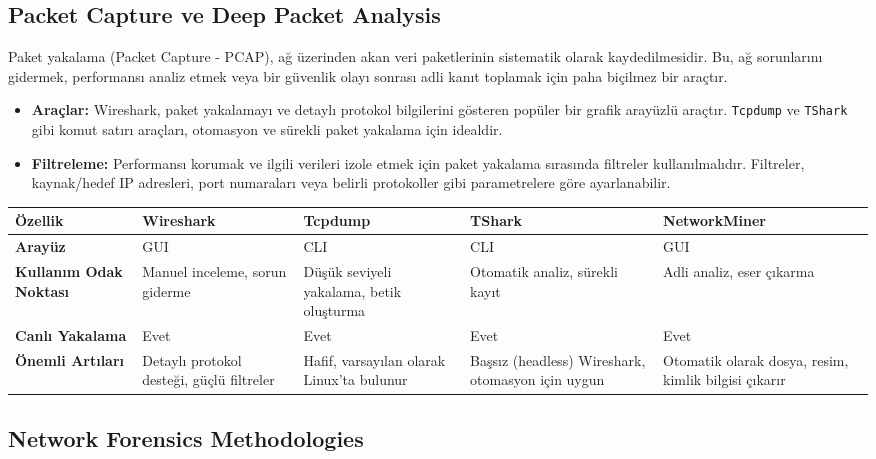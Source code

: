 \subsection{Packet Capture ve Deep Packet Analysis}

Paket yakalama (Packet Capture - PCAP), ağ üzerinden akan veri paketlerinin sistematik olarak kaydedilmesidir. Bu, ağ sorunlarını gidermek, performansı analiz etmek veya bir güvenlik olayı sonrası adli kanıt toplamak için paha biçilmez bir araçtır.

\begin{itemize}
\item \textbf{Araçlar:} Wireshark, paket yakalamayı ve detaylı protokol bilgilerini gösteren popüler bir grafik arayüzlü araçtır. \texttt{Tcpdump} ve \texttt{TShark} gibi komut satırı araçları, otomasyon ve sürekli paket yakalama için idealdir.
\item \textbf{Filtreleme:} Performansı korumak ve ilgili verileri izole etmek için paket yakalama sırasında filtreler kullanılmalıdır. Filtreler, kaynak/hedef IP adresleri, port numaraları veya belirli protokoller gibi parametrelere göre ayarlanabilir.
\end{itemize}


\begin{adjustbox}{max width=\textwidth}
\begin{tabularx}{\textwidth}{|l|X|X|X|X|}
\hline
\textbf{Özellik} & \textbf{Wireshark} & \textbf{Tcpdump} & \textbf{TShark} & \textbf{NetworkMiner} \\
\hline
\textbf{Arayüz} & GUI & CLI & CLI & GUI \\
\hline
\textbf{Kullanım Odak Noktası} & Manuel inceleme, sorun giderme & Düşük seviyeli yakalama, betik oluşturma & Otomatik analiz, sürekli kayıt & Adli analiz, eser çıkarma \\
\hline
\textbf{Canlı Yakalama} & Evet & Evet & Evet & Evet \\
\hline
\textbf{Önemli Artıları} & Detaylı protokol desteği, güçlü filtreler & Hafif, varsayılan olarak Linux'ta bulunur & Başsız (headless) Wireshark, otomasyon için uygun & Otomatik olarak dosya, resim, kimlik bilgisi çıkarır \\
\hline
\end{tabularx}
\end{adjustbox}



\subsection{Network Forensics Methodologies}

